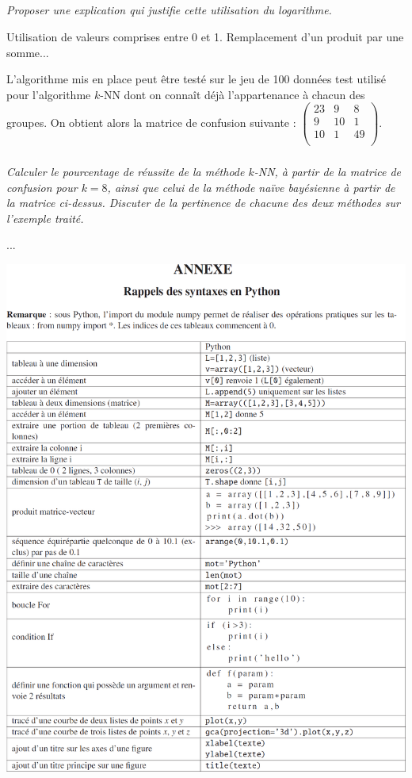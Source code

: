 \subparagraph{}\textit{Proposer une explication qui justifie cette utilisation du logarithme.}
\ifprof
\begin{corrige}
Utilisation de valeurs comprises entre 0 et 1. Remplacement d'un produit par une somme...
\end{corrige}
\else
\fi

\ifprof
\else
L’algorithme mis en place peut être testé sur le jeu de 100 données test utilisé pour l’algorithme $k$-NN
dont on connaît déjà l’appartenance à chacun des groupes. On obtient alors la matrice de confusion
suivante :
$\begin{pmatrix}
23 &9 &8 \\
9 &10 &1\\
10 &1 &49\\
\end{pmatrix}$.
\fi

\subparagraph{}\textit{Calculer le pourcentage de réussite de la méthode $k$-NN, à partir de la matrice de confusion
pour $k = 8$, ainsi que celui de la méthode naïve bayésienne à partir de la matrice
ci-dessus. Discuter de la pertinence de chacune des deux méthodes sur l’exemple traité.}
\ifprof
\begin{corrige}
...
\end{corrige}
\else
\fi

\ifprof
\else
\begin{center}
\includegraphics[width=\textwidth]{images/ann_01}
\end{center}
\fi

